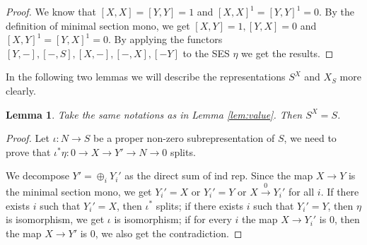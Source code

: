\documentclass[reqno,11pt]{amsart}
\numberwithin{equation}{section}
\theoremstyle{plain}
\newtheorem{lemma}[theorem]{Lemma}
\theoremstyle{plain}
\numberwithin{equation}{section}
\theoremstyle{remark}
\begin{document}
\begin{proof}
We know that $[X,X]=[Y,Y]=1$ and $[X,X]^1=[Y,Y]^1=0$. By the definition of minimal section mono, we get
$[X,Y]=1, [Y,X]=0$ and $[X,Y]^1=[Y,X]^1=0$. By applying the functors $[Y,-],[-,S],[X,-],[-,X],[-Y]$ to the SES $\eta$ we get the results. 
\end{proof}
In the following two lemmas we will describe the representations $S^X$ and $X_S$ more clearly.
\begin{lemma} Take the same notations as in Lemma \ref{lem:value}. Then $S^X=S$.
\end{lemma}
\begin{proof}
	Let $\iota:N \longrightarrow S$ be a proper non-zero subrepresentation of $S$, we need to prove that $\iota^* \eta: 0\longrightarrow X \longrightarrow Y' \longrightarrow N \longrightarrow 0$ splits.
	
\begin{center}
\end{center}
	
	We decompose $Y'=\oplus_i Y_i'$ as the direct sum of ind rep. Since the map $X\longrightarrow Y$ is the minimal section mono, we get $Y_i'=X$ or $Y_i'=Y$ or $X\stackrel{0}{\longrightarrow} Y_i'$ for all $i$.
	If there exists $i$ such that $Y_i'=X$, then $\iota^* $ splits; if there exists $i$ such that $Y_i'=Y$, then $\eta$ is isomorphism, we get $\iota$ is isomorphism; if for every $i$ the map $X \longrightarrow Y_i'$ is $0$, then the map $X \longrightarrow Y'$ is $0$, we also get the contradiction.
\end{proof}
\end{document}
